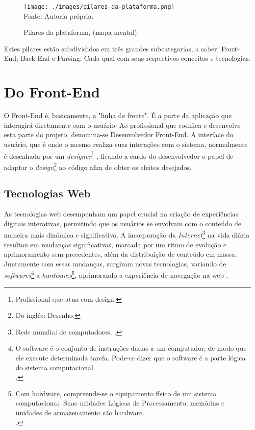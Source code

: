 \begin{figure}[H]
    \centering
    \caption{Pilares da plataforma, (mapa mental)}
    \texttt{[image: ./images/pilares-da-plataforma.png]}
    \label{fig:pilares-da-plataforma} \\
    \textnormal{\fontsize{10pt}{12pt}Fonte: Autoria própria.}
\end{figure}

Estes pilares estão subdivididos em três grandes subcategorias, a saber: Front-End;
Back-End e Parsing. Cada qual com seus respectivos conceitos e tecnologias.

\section{Do Front-End}

O Front-End é, basicamente, a "linha de frente". É a parte da aplicação que interagirá
diretamente com o usuário. Ao profissional que codifica e desenvolve esta parte do
projeto, denomina-se Desenvolvedor Front-End. A interface do usuário, que é
onde o mesmo realiza suas interações com o sistema, normalmente é desenhada por
um
\textit{designer}\footnote{Profissional que atua com design.
}
, ficando a cardo do desenvolvedor o papel de adaptar o
\textit{design}\footnote{Do inglês: Desenho.
}
ao código afim de obter os efeitos desejados.
\cite{totvs-front-end}

\subsection{Tecnologias Web}

As tecnologias
\acrshort{web}
desempenham um papel crucial na criação de experiências
digitais interativas, permitindo que os usuários se envolvam com o conteúdo de maneira mais
dinâmica e significativa. A incorporação da
\textit{Internet}\footnote{Rede mundial de computadores, \cite{marco-civil-art-2}.
}
na vida diária resultou em mudanças
significativas, marcada por um ritmo de evolução e aprimoramento sem precedentes, além da
distribuição de conteúdo em massa. Juntamente com essas mudanças, surgiram novas
tecnologias, variando de
\textit{softwares}\footnote{O software é o conjunto de instruções dadas a um computador, de modo que
    ele execute determinada tarefa. Pode-se dizer que o software é
    a parte lógica do sistema computacional.  \\  \cite{hardware-e-software}.
}
a
\textit{hardwares}\footnote{Com hardware, compreende-se o equipamento físico de um sistema computacional.
    Suas unidades Lógicas de Processamento, memórias e unidades de armazenamento são
    hardware.  \\  \cite{hardware-e-software}.
},
aprimorando a experiência de navegação na
\acrshort{web}
\cite{molgado}.


